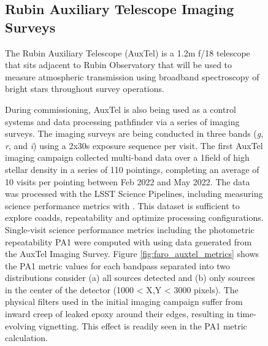 \begin{figure}[!ht]
\subsection{Rubin Auxiliary Telescope Imaging Surveys} \label{ssec:auxtel}

The Rubin Auxiliary Telescope\cite{10.1117/12.2561112} (AuxTel) is a 1.2m f/18 telescope that sits adjacent to Rubin Observatory that will be used to measure atmospheric transmission using broadband spectroscopy of bright stars throughout survey operations. 

During commissioning, AuxTel is also being used as a control systems and data processing pathfinder via a series of imaging surveys. The imaging surveys are being conducted in three bands (\emph{g}, \emph{r}, and \emph{i}) using a 2x30s exposure sequence per visit.
The first AuxTel imaging campaign collected multi-band data over a 1\degsq field of high stellar density in a series of 110 pointings, completing an average of 10 visits per pointing between Feb 2022 and May 2022. The data was processed with the LSST Science Pipelines, including measuring science performance metrics with \faro. This dataset is sufficient to explore coadds, repeatability and optimize processing configurations.
Single-visit science performance metrics including the photometric repeatability PA1 were computed with \faro using data generated from the AuxTel Imaging Survey. 
Figure \ref{fig:faro_auxtel_metrics} shows the PA1 metric values for each bandpass separated into two distributions consider (a) all sources detected and (b) only sources in the center of the detector (1000 < X,Y < 3000 pixels). The physical filters used in the initial imaging campaign suffer from inward creep of leaked epoxy around their edges, resulting in time-evolving vignetting. This effect is readily seen in the PA1 metric calculation.  


\end{figure}
